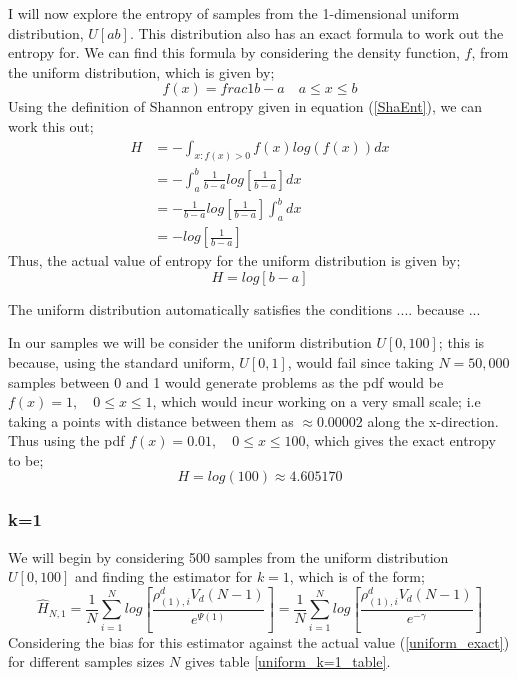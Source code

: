 \documentclass{article}
\begin{document}
I will now explore the entropy of samples from the 1-dimensional uniform distribution, $U[a b]$. This distribution also has an exact formula to work out the entropy for. We can find this formula by considering the density function, $f$, from the uniform distribution, which is given by;
\begin{equation}
f(x) = frac{1}{b-a} \quad a \leq x \leq b
\end{equation}
 Using the definition of Shannon entropy given in equation (\ref{ShaEnt}), we can work this out;
\begin{align}
H &= - \int_{x : f(x) > 0} f(x) log(f(x)) dx \nonumber \\ 
&= - \int_{a}^{b} \frac{1}{b-a} log \left[ \frac{1}{b-a} \right] dx \nonumber \\
&= - \frac{1}{b-a} log \left[ \frac{1}{b-a} \right]  \int_{a}^{b} dx \nonumber \\
&= -  log  \left[ \frac{1}{b-a} \right] \nonumber
\end{align}
Thus, the actual value of entropy for the uniform distribution is given by;
\begin{equation} \label{UnifEnt}
H = log [ b-a ]
\end{equation}

The uniform distribution automatically satisfies the conditions .... because ... 

In our samples we will be consider the uniform distribution $U[0,100]$; this is because, using the standard uniform, $U[0,1]$, would fail since taking $N=50,000$ samples between 0 and 1 would generate problems as the pdf would be $f(x) = 1 , \quad 0 \leq x \leq 1$, which would incur working on a very small scale; i.e taking a points with distance between them as $\approx 0.00002$ along the x-direction. Thus using the pdf $f(x) = 0.01 , \quad 0 \leq x \leq 100$, which gives the exact entropy to be;
\begin{equation} \label{uniform_exact}
H = log(100) \approx 4.605170
\end{equation}

\subsubsection{k=1} \label{U_k=1}

We will begin by considering 500 samples from the uniform distribution $U[0,100]$ and finding the estimator for $k=1$, which is of the form;
\begin{equation} 
\hat{H}_{N, 1} = \frac{1}{N} \sum_{i=1}^{N} log \left[ \frac{\rho_{(1),i}^{d} V_{d} (N-1)}{e^{\Psi(1)}} \right] = \frac{1}{N} \sum_{i=1}^{N} log \left[ \frac{\rho_{(1),i}^{d} V_{d} (N-1)}{e^{-\gamma}} \right] \nonumber
\end{equation}
Considering the bias for this estimator against the actual value (\ref{uniform_exact}) for different samples sizes $N$ gives table \ref{uniform_k=1_table}.
\end{document}
